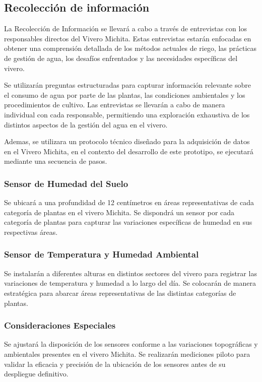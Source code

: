 \subsection{Recolección de información}
La Recolección de Información se llevará a cabo a través de entrevistas con los
responsables directos del Vivero Michita. Estas entrevistas estarán enfocadas
en obtener una comprensión detallada de los métodos actuales de riego, las
prácticas de gestión de agua, los desafíos enfrentados y las necesidades
específicas del vivero.

\bigbreak
Se utilizarán preguntas estructuradas para capturar
información relevante sobre el consumo de agua por parte de las plantas, las
condiciones ambientales y los procedimientos de cultivo. Las entrevistas se
llevarán a cabo de manera individual con cada responsable, permitiendo una
exploración exhaustiva de los distintos aspectos de la gestión del agua en el
vivero.

\bigbreak
Ademas, se utilizara un protocolo técnico diseñado para la adquisición de datos en el Vivero Michita, en el contexto del desarrollo de este prototipo, se ejecutará mediante una secuencia de pasos.

\subsubsection*{Sensor de Humedad del Suelo}
Se ubicará a una profundidad de 12 centímetros en áreas representativas de cada categoría de plantas en el vivero Michita. Se dispondrá un sensor por cada categoría de plantas para capturar las variaciones específicas de humedad en sus respectivas áreas.

\subsubsection*{Sensor de Temperatura y Humedad Ambiental}
Se instalarán a diferentes alturas en distintos sectores del vivero para registrar las variaciones de temperatura y humedad a lo largo del día. Se colocarán de manera estratégica para abarcar áreas representativas de las distintas categorías de plantas.

\subsubsection*{Consideraciones Especiales}
Se ajustará la disposición de los sensores conforme a las variaciones topográficas y ambientales presentes en el vivero Michita. Se realizarán mediciones piloto para validar la eficacia y precisión de la ubicación de los sensores antes de su despliegue definitivo.